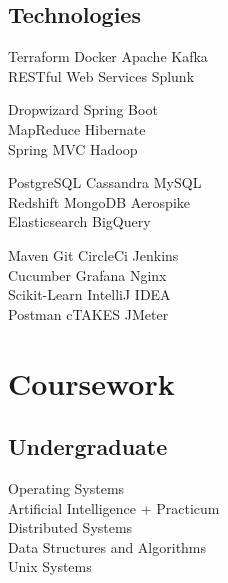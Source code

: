 \documentclass[]{rajnikant-resume-openfont}
\begin{document}
\begin{minipage}[t]{0.33\textwidth}
\subsection{Technologies}
 Terraform   \textbullet{}  Docker \textbullet{}  Apache Kafka  \\
 RESTful Web Services \textbullet{} Splunk 
 \sectionsep
 
  Dropwizard \textbullet{} Spring Boot \\ 
 MapReduce  \textbullet{} Hibernate \\
 Spring MVC \textbullet{} Hadoop
\sectionsep

 PostgreSQL \textbullet{} Cassandra \textbullet{} MySQL \\
  Redshift \textbullet{} MongoDB \textbullet{} Aerospike \\
   Elasticsearch \textbullet{} BigQuery
 \sectionsep
 
 \sectionsep
 
  \sectionsep
 
      Maven  \textbullet{} Git \textbullet{} CircleCi \textbullet{} Jenkins \\
      Cucumber \textbullet{} Grafana \textbullet{} Nginx \\
       Scikit-Learn  \textbullet{} IntelliJ IDEA \\
      Postman \textbullet{} cTAKES \textbullet{} JMeter 
\sectionsep



\section{Coursework}
\subsection{Undergraduate}
Operating Systems \\
Artificial Intelligence + Practicum \\
Distributed Systems \\
Data Structures and Algorithms\\
Unix Systems 
\sectionsep



%
%

\end{minipage} 
\hfill
\end{document}
